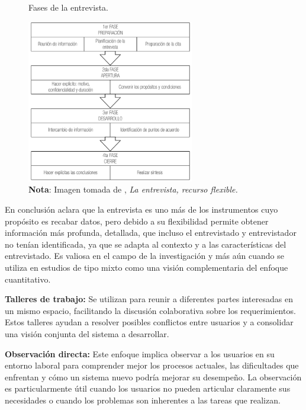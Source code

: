 		\begin{figure}[h] %
			\caption[Fases de la entrevista]
			{\newline Fases de la entrevista.} %
			\vspace{0.3cm}
			\centering
			\includegraphics[width=0.65\textwidth]{imagenes/figura2_2.png} %
			\vspace{0.3cm}
			\caption*{\textup{\textbf{Nota}: Imagen tomada de \textcite{diaz2013entrevista}, \textit{La entrevista, recurso flexible.}}}
			\vspace{-0.8cm}
			\label{fig:figura2_2} %
		\end{figure}
		
		En conclusión \textcite{diaz2013entrevista} aclara que la entrevista es uno más de los instrumentos cuyo propósito es recabar datos, pero debido a su flexibilidad permite obtener información más profunda, detallada, que incluso el entrevistado y entrevistador no tenían identificada, ya que se adapta al contexto y a las características del entrevistado. Es valiosa en el campo de la investigación y más aún cuando se utiliza en estudios de tipo mixto como una visión complementaria del enfoque cuantitativo.
						
		\textbf{Talleres de trabajo:} Se utilizan para reunir a diferentes partes interesadas en un mismo espacio, facilitando la discusión colaborativa sobre los requerimientos. Estos talleres ayudan a resolver posibles conflictos entre usuarios y a consolidar una visión conjunta del sistema a desarrollar.
		
		\textbf{Observación directa:} Este enfoque implica observar a los usuarios en su entorno laboral para comprender mejor los procesos actuales, las dificultades que enfrentan y cómo un sistema nuevo podría mejorar su desempeño. La observación es particularmente útil cuando los usuarios no pueden articular claramente sus necesidades o cuando los problemas son inherentes a las tareas que realizan.
		
